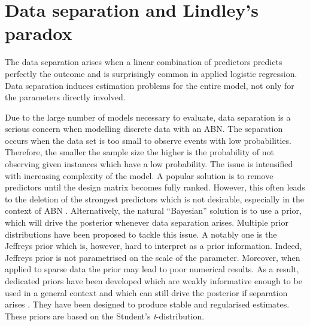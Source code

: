 \documentclass{svproc}
\newcommand{\rf}[1]{\textcolor{green}{#1}}
\begin{document}
\vspace*{-0.5cm}

\section{Data separation and Lindley's paradox}
\label{sec:3}
The data separation  arises when a linear combination of predictors predicts perfectly the outcome and is surprisingly common in applied logistic regression. Data separation induces estimation problems for the entire model, not only for the parameters directly involved.

Due to the large number of models necessary to evaluate, data separation is a serious concern when 
modelling  discrete data with an ABN. The separation occurs when the data set is too small to observe events with low probabilities. Therefore, the smaller the sample size the higher is the probability of not observing given instances which have a low probability. The issue is intensified  with increasing complexity of the model. A popular solution is to remove predictors until the design matrix becomes fully ranked. However, this often leads to the deletion of the strongest predictors which is not desirable, especially in the context of ABN \cite{zorn2005solution}. 
Alternatively, the natural ``Bayesian'' solution is to use a prior, which will drive the posterior whenever data separation arises. 
Multiple prior distributions have been proposed to tackle this issue. A notably one is the Jeffreys prior  \cite{firth1993bias} which is, however,  hard to interpret as a prior information. Indeed, Jeffreys prior is not parametrised on the scale of the parameter. Moreover,  when applied to sparse data the prior may lead to poor numerical results. 
As a result, dedicated priors have been developed which are weakly informative enough to be used in a general context and which can still drive the posterior if separation arises \cite{gelman}. They have been designed to produce stable and regularised estimates. These priors are based on the Student's \emph{t}-distribution.
\end{document}
